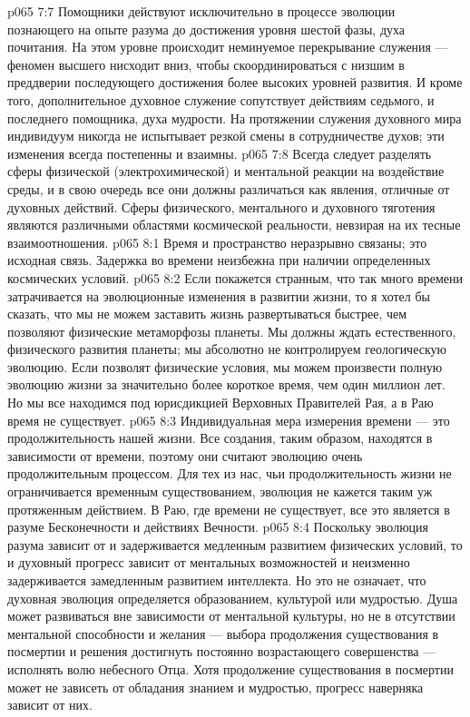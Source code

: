 \vs p065 7:7 Помощники действуют исключительно в процессе эволюции познающего на опыте разума до достижения уровня шестой фазы, духа почитания. На этом уровне происходит неминуемое перекрывание служения --- феномен высшего нисходит вниз, чтобы скоординироваться с низшим в преддверии последующего достижения более высоких уровней развития. И кроме того, дополнительное духовное служение сопутствует действиям седьмого, и последнего помощника, духа мудрости. На протяжении служения духовного мира индивидуум никогда не испытывает резкой смены в сотрудничестве духов; эти изменения всегда постепенны и взаимны.
\vs p065 7:8 Всегда следует разделять сферы физической (электрохимической) и ментальной реакции на воздействие среды, и в свою очередь все они должны различаться как явления, отличные от духовных действий. Сферы физического, ментального и духовного тяготения являются различными областями космической реальности, невзирая на их тесные взаимоотношения.
\vs p065 8:1 Время и пространство неразрывно связаны; это исходная связь. Задержка во времени неизбежна при наличии определенных космических условий.
\vs p065 8:2 Если покажется странным, что так много времени затрачивается на эволюционные изменения в развитии жизни, то я хотел бы сказать, что мы не можем заставить жизнь развертываться быстрее, чем позволяют физические метаморфозы планеты. Мы должны ждать естественного, физического развития планеты; мы абсолютно не контролируем геологическую эволюцию. Если позволят физические условия, мы можем произвести полную эволюцию жизни за значительно более короткое время, чем один миллион лет. Но мы все находимся под юрисдикцией Верховных Правителей Рая, а в Раю время не существует.
\vs p065 8:3 Индивидуальная мера измерения времени --- это продолжительность нашей жизни. Все создания, таким образом, находятся в зависимости от времени, поэтому они считают эволюцию очень продолжительным процессом. Для тех из нас, чьи продолжительность жизни не ограничивается временным существованием, эволюция не кажется таким уж протяженным действием. В Раю, где времени не существует, все это является  в разуме Бесконечности и действиях Вечности.
\vs p065 8:4 Поскольку эволюция разума зависит от и задерживается медленным развитием физических условий, то и духовный прогресс зависит от ментальных возможностей и неизменно задерживается замедленным развитием интеллекта. Но это не означает, что духовная эволюция определяется образованием, культурой или мудростью. Душа может развиваться вне зависимости от ментальной культуры, но не в отсутствии ментальной способности и желания --- выбора продолжения существования в посмертии и решения достигнуть постоянно возрастающего совершенства --- исполнять волю небесного Отца. Хотя продолжение существования в посмертии может не зависеть от обладания знанием и мудростью, прогресс наверняка зависит от них.
